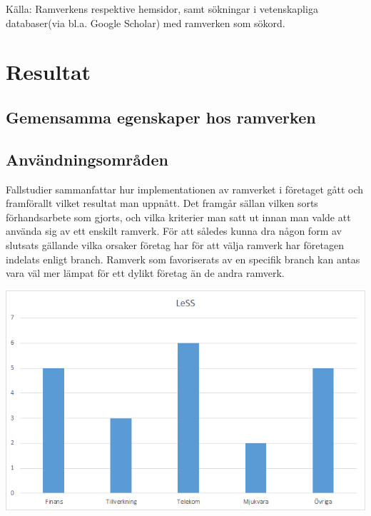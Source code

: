 		Källa: Ramverkens respektive hemsidor\cite{dad_web, less_web, safe_web}, samt sökningar i vetenskapliga databaser(via bl.a. Google Scholar) med ramverken som sökord.
		
	
	
\newpage
\section{Resultat}
	
		
	
	\subsection{Gemensamma egenskaper hos ramverken}
		
	
	\subsection{Användningsområden}

		Fallstudier sammanfattar hur implementationen av ramverket i företaget gått och framförallt vilket resultat man uppnått. Det framgår sällan vilken sorts förhandsarbete som gjorts, och vilka kriterier man satt ut innan man valde att använda sig av ett enskilt ramverk.
		För att således kunna dra någon form av slutsats gällande vilka orsaker företag har för att välja ramverk har företagen indelats enligt branch.
		Ramverk som favoriserats av en specifik branch kan antas vara väl mer lämpat för ett dylikt företag än de andra ramverk.
	
		
		\begin{center}
			\includegraphics{Grafer/LeSS_brancher.png}
		\end{center}
	
